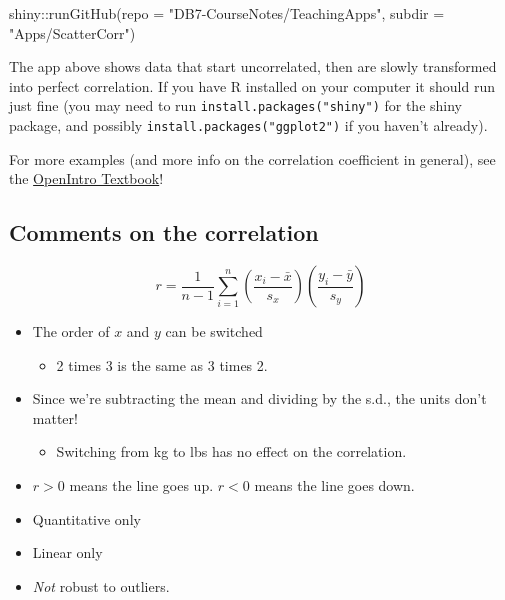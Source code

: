 \documentclass[
  letterpaper,
  DIV=11,
  numbers=noendperiod,
  oneside]{scrreprt}
\newenvironment{Shaded}{\begin{snugshade}}{\end{snugshade}}
\newcommand{\AttributeTok}[1]{\textcolor[rgb]{0.40,0.45,0.13}{#1}}
\newcommand{\FunctionTok}[1]{\textcolor[rgb]{0.28,0.35,0.67}{#1}}
\newcommand{\NormalTok}[1]{\textcolor[rgb]{0.00,0.23,0.31}{#1}}
\newcommand{\SpecialCharTok}[1]{\textcolor[rgb]{0.37,0.37,0.37}{#1}}
\newcommand{\StringTok}[1]{\textcolor[rgb]{0.13,0.47,0.30}{#1}}
\providecommand{\tightlist}{%
  \setlength{\itemsep}{0pt}\setlength{\parskip}{0pt}}\usepackage{longtable,booktabs,array}
\begin{document}
\begin{Shaded}
\begin{Highlighting}[]
\NormalTok{shiny}\SpecialCharTok{::}\FunctionTok{runGitHub}\NormalTok{(}\AttributeTok{repo =} \StringTok{"DB7{-}CourseNotes/TeachingApps"}\NormalTok{, }
    \AttributeTok{subdir =} \StringTok{"Apps/ScatterCorr"}\NormalTok{)}
\end{Highlighting}
\end{Shaded}

The app above shows data that start uncorrelated, then are slowly
transformed into perfect correlation. If you have R installed on your
computer it should run just fine (you may need to run
\texttt{install.packages("shiny")} for the shiny package, and possibly
\texttt{install.packages("ggplot2")} if you haven't already).

For more examples (and more info on the correlation coefficient in
general), see the
\href{https://www.openintro.org/book/biostat/}{OpenIntro Textbook}!

\hypertarget{comments-on-the-correlation}{%
\subsection{Comments on the
correlation}\label{comments-on-the-correlation}}

\[
r = \frac{1}{n-1}\sum_{i=1}^n\left(\frac{x_i - \bar x}{s_x}\right)\left(\frac{y_i - \bar y}{s_y}\right)
\]

\begin{itemize}
\tightlist
\item
  The order of \(x\) and \(y\) can be switched

  \begin{itemize}
  \tightlist
  \item
    2 times 3 is the same as 3 times 2.
  \end{itemize}
\item
  Since we're subtracting the mean and dividing by the s.d., the units
  don't matter!

  \begin{itemize}
  \tightlist
  \item
    Switching from kg to lbs has no effect on the correlation.
  \end{itemize}
\item
  \(r>0\) means the line goes up. \(r < 0\) means the line goes down.
\item
  Quantitative only
\item
  Linear only
\item
  \emph{Not} robust to outliers.
\end{itemize}
\end{document}

